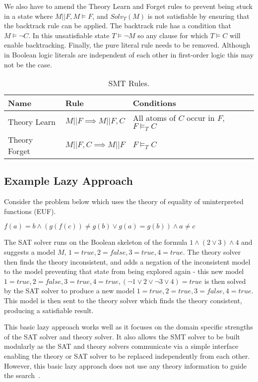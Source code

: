 \documentclass[]{final_report}
\begin{document}
We also have to amend the Theory Learn and Forget rules to prevent being stuck in a state where $M || F, M \models F$, and $Solv_T(M)$ is not satisfiable by ensuring that the backtrack rule can be applied. The backtrack rule has a condition that $M \models \lnot C$. In this unsatisfiable state $T \models \lnot{M}$ so any clause for which $T \models C$ will enable backtracking. Finally, the pure literal rule needs to be removed. Although in Boolean logic literals are independent of each other in first-order logic this may not be the case.

\begin{table}[t]
\centering
\label{smt-rulesl}
\begin{tabular}{|l|l|l|}
\hline
Name & Rule & Conditions \\ \hline
Theory Learn & $M || F \implies M|| F, C $ & All atoms of $C$ occur in $F$, $F \models _T C $ \\ \hline
Theory Forget & $M || F, C \implies M || F $ & $F \models _T C$ \\ \hline
\end{tabular}
\caption{SMT Rules.}
\end{table}

\subsection{Example Lazy Approach}
Consider the problem below which uses the theory of equality of uninterpreted functions (EUF).

$ f(a) = b \land (g(f(c)) \neq g(b) \lor g(a) = g(b)) \land a \neq c $

The SAT solver runs on the Boolean skeleton of the formula $1 \land (2 \lor 3) \land 4$ and suggests a model $M$, $1 = \mathit{true}, 2 = \mathit{false}, 3 = \mathit{true}, 4 = \mathit{true}$. The theory solver then finds the theory inconsistent, and adds a negation of the inconsistent model to the model preventing that state from being explored again - this new model $ 1 = \mathit{true}, 2 = \mathit{false}, 3 = \mathit{true}, 4 = \mathit{true}, (\lnot 1 \lor 2 \lor \lnot 3 \lor 4 ) = true $ is then solved by the SAT solver to produce a new model $ 1 = \mathit{true}, 2 = \mathit{true}, 3 = \mathit{false}, 4 = \mathit{true}$. This model is then sent to the theory solver which finds the theory consistent, producing a satisfiable result.

This basic lazy approach works well as it focuses on the domain specific strengths of the SAT solver and theory solver. It also allows the SMT solver to be built modularly as the SAT and theory solvers communicate via a simple interface enabling the theory or SAT solver to be replaced independently from each other. However, this basic lazy approach does not use any theory information to guide the search~\cite{sattosmt}.
\end{document}
